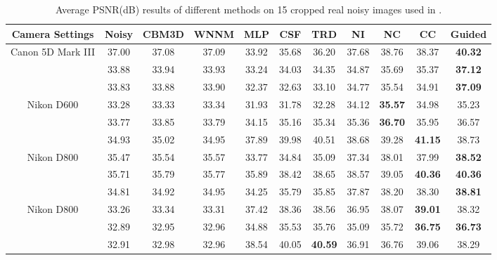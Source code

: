 \documentclass[10pt,twocolumn,letterpaper]{article}
\begin{document}
\begin{table}\label{tab2}
\caption{Average PSNR(dB) results of different methods on 15 cropped real noisy images used in \cite{crosschannel2016}.}
\label{tab1}
\begin{center}
\renewcommand\arraystretch{1}
\begin{tabular}{|c||c|c|c|c|c|c|c|c|c|c|}
\hline
Camera Settings & \textbf{Noisy} &\textbf{CBM3D}&\textbf{WNNM}&\textbf{MLP}&\textbf{CSF}&\textbf{TRD}& \textbf{NI}& \textbf{NC}& \textbf{CC} &\textbf{Guided} 
\\
\hline
\multirow{3}{*}{\small{Canon 5D Mark III}} 
& 37.00 & 37.08 & 37.09 & 33.92 & 35.68 & 36.20 & 37.68 & 38.76 & 38.37 & \textbf{40.32}
\\ 
\cline{2-11} 
\multirow{3}{*}{ISO = 3200}   
& 33.88 & 33.94 & 33.93 & 33.24 & 34.03 & 34.35 & 34.87 & 35.69 & 35.37 & \textbf{37.12}
\\ 
\cline{2-11}    
& 33.83 & 33.88 & 33.90 & 32.37 & 32.63 & 33.10 & 34.77 & 35.54 & 34.91 & \textbf{37.09}  
\\
\hline
\multirow{3}{*}{Nikon D600} 
& 33.28 & 33.33 & 33.34 & 31.93 & 31.78 & 32.28 & 34.12 & \textbf{35.57} & 34.98 & 35.23
\\ 
\cline{2-11} 
\multirow{3}{*}{ISO = 3200}   
& 33.77 & 33.85 & 33.79 & 34.15 & 35.16 & 35.34 & 35.36 & \textbf{36.70} & 35.95 & 36.57
\\ 
\cline{2-11}    
& 34.93 & 35.02 & 34.95 & 37.89 & 39.98 & 40.51 & 38.68 & 39.28 & \textbf{41.15} & 38.73
\\
\hline
\multirow{3}{*}{Nikon D800} 
& 35.47 & 35.54 & 35.57 & 33.77 & 34.84 & 35.09 & 37.34 & 38.01 & 37.99 & \textbf{38.52}
\\ 
\cline{2-11} 
\multirow{3}{*}{ISO = 1600}   
& 35.71 & 35.79 & 35.77 & 35.89 & 38.42 & 38.65 & 38.57 & 39.05 & \textbf{40.36} & \textbf{40.36}
\\ 
\cline{2-11}    
& 34.81 & 34.92 & 34.95 & 34.25 & 35.79 & 35.85 & 37.87 & 38.20 & 38.30 & \textbf{38.81}
\\
\hline
\multirow{3}{*}{Nikon D800} 
& 33.26 & 33.34 & 33.31 & 37.42 & 38.36 & 38.56 & 36.95 & 38.07 & \textbf{39.01} & 38.32
\\ 
\cline{2-11} 
\multirow{3}{*}{ISO = 3200}   
& 32.89 & 32.95 & 32.96 & 34.88 & 35.53 & 35.76 & 35.09 & 35.72 & \textbf{36.75} & \textbf{36.73}
\\ 
\cline{2-11}    
& 32.91 & 32.98 & 32.96 & 38.54 & 40.05 & \textbf{40.59} & 36.91 & 36.76 & 39.06 & 38.29
\\
\hline

\end{tabular}
\end{center}
\end{table}
\end{document}
